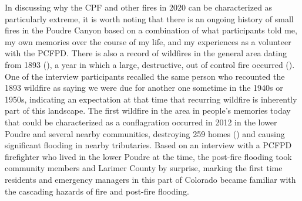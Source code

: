 \documentclass[
]{article}
\begin{document}
In discussing why the CPF and other fires in 2020 can be characterized as particularly extreme, it is worth noting that there is an ongoing history of small fires in the Poudre Canyon based on a combination of what participants told me, my own memories over the course of my life, and my experiences as a volunteer with the PCFPD. There is also a record of wildfires in the general area dating from 1893 (), a year in which a large, destructive, out of control fire occurred (). One of the interview participants recalled the same person who recounted the 1893 wildfire as saying we were due for another one sometime in the 1940s or 1950s, indicating an expectation at that time that recurring wildfire is inherently part of this landscape. The first wildfire in the area in people's memories today that could be characterized as a conflagration occurred in 2012 in the lower Poudre and several nearby communities, destroying 259 homes () and causing significant flooding in nearby tributaries. Based on an interview with a PCFPD firefighter who lived in the lower Poudre at the time, the post-fire flooding took community members and Larimer County by surprise, marking the first time residents and emergency managers in this part of Colorado became familiar with the cascading hazards of fire and post-fire flooding.
\end{document}
